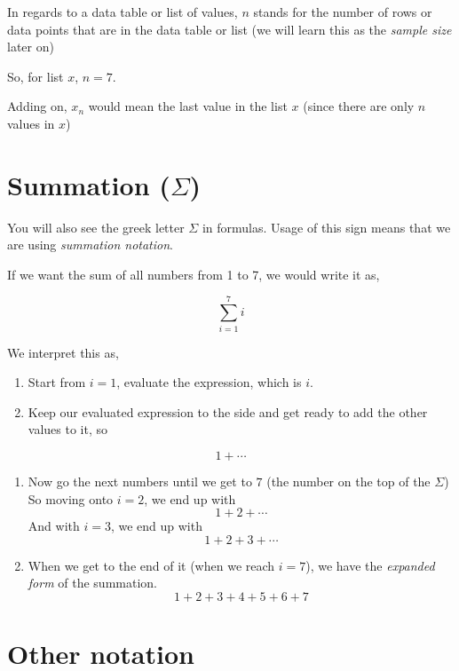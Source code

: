 \documentclass[
]{book}
\begin{document}
In regards to a data table or list of values, \(n\) stands for the number
of rows or data points that are in the data table or list (we will learn
this as the \emph{sample size} later on)

So, for list \(x\), \(n = 7\).

Adding on, \(x_n\) would mean the last value in the list \(x\) (since there
are only \(n\) values in \(x\))

\hypertarget{summation-sigma}{%
\section{\texorpdfstring{Summation (\(\Sigma\))}{Summation (\textbackslash Sigma)}}\label{summation-sigma}}

You will also see the greek letter \(\Sigma\) in formulas. Usage of this
sign means that we are using \emph{summation notation}.

If we want the sum of all numbers from 1 to 7, we would write it as,

\[\sum_{i=1}^7 i\]

We interpret this as,

\begin{enumerate}
\def\labelenumi{\arabic{enumi}.}
\item
  Start from \(i = 1\), evaluate the expression, which is \(i\).
\item
  Keep our evaluated expression to the side and get ready to add the
  other values to it, so
\end{enumerate}

\[1 + \cdots\]

\begin{enumerate}
\def\labelenumi{\arabic{enumi}.}
\setcounter{enumi}{2}
\item
  Now go the next numbers until we get to \(7\) (the number on the top
  of the \(\Sigma\)) So moving onto \(i = 2\), we end up with
  \[1 + 2 + \cdots\] \newline And with \(i = 3\), we end up with
  \[1 + 2 + 3 + \cdots\] \newline
\item
  When we get to the end of it (when we reach \(i = 7\)), we have the
  \emph{expanded form} of the summation. \[1 + 2 + 3+ 4 + 5 + 6 + 7\]
\end{enumerate}

\hypertarget{other-notation}{%
\section{Other notation}\label{other-notation}}
\end{document}
